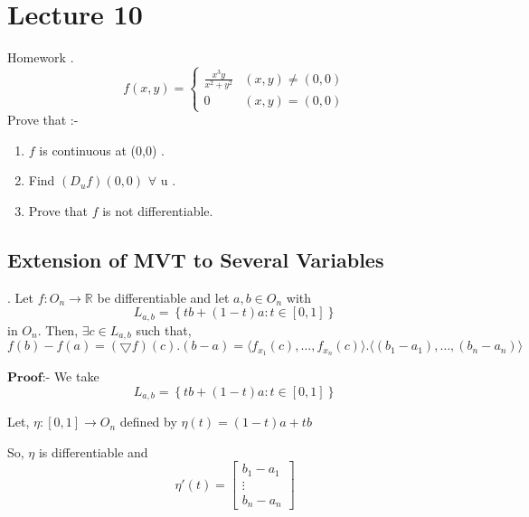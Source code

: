 \documentclass[Analysis-3]{subfiles}
\begin{document}
\chapter*{Lecture 10} %
\setcounter{chapter}{10} %


\begin{Eg}{Homework}
  . \[ f(x,y) = \begin{cases}
        \frac{x^{3}y}{x^2 + y^2} & (x,y) \neq (0,0) \\
        0 & (x,y) = (0,0)
    \end{cases}\]
Prove that :- 
\begin{enumerate}
    \item $f$ is continuous at (0,0) .
    \item Find $(D_{u}f)(0,0)$ $\forall$ u .
    \item Prove that $f$ is not differentiable.
\end{enumerate}    
\end{Eg}

\section{Extension of MVT to Several Variables}

\begin{Thm}{}
  .  Let $f : O_n \to \mathbb{R}$ be differentiable and let $a,b \in  O_n$ with \[L_{a,b} = \left\{ tb + (1-t)a : t \in [0,1]\right\} \] in $O_n$. Then, $\exists c \in L_{a,b}$ such that, \[ f(b) - f(a) = (\bigtriangledown f)(c) . (b-a) = \langle f_{x_1}(c),  \ldots ,f_{x_n}(c) \rangle .\langle (b_1 - a_1), \ldots, (b_n - a_n) \rangle  \]  
\end{Thm}

$\textbf{Proof:-}$ We take \[L_{a,b} = \left\{ tb + (1-t)a : t \in [0,1]\right\} \]

Let, $\eta : [0,1] \to O_n$ defined by $\eta (t) = (1-t)a + tb$

So, $\eta$ is differentiable and \[ \eta'(t) = \begin{bmatrix}
    b_1 - a_1\\
    \vdots \\
    b_n -a_n
\end{bmatrix} \]

\end{document}
